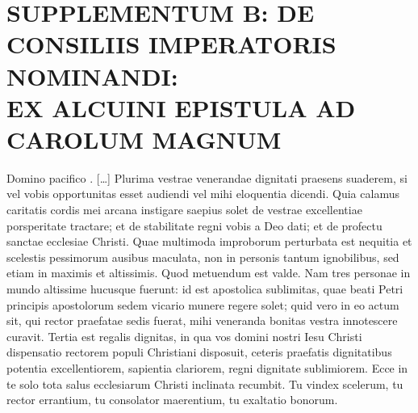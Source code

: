 \documentclass[12pt]{article}
\begin{document}
{		\section{SUPPLEMENTUM B: DE CONSILIIS IMPERATORIS NOMINANDI:\\ EX ALCUINI EPISTULA AD CAROLUM MAGNUM}
		\beginnumbering
		\pstart
		\noindent Domino pacifico . [\dots]
		\pend
		\pstart
		Plurima vestrae venerandae dignitati praesens suaderem, si vel vobis opportunitas esset audiendi vel mihi eloquentia dicendi. Quia calamus caritatis cordis mei arcana instigare saepius solet de vestrae excellentiae porsperitate tractare; et de stabilitate regni vobis a Deo dati; et de profectu sanctae ecclesiae Christi. Quae multimoda improborum perturbata est nequitia et scelestis pessimorum ausibus maculata, non in personis tantum ignobilibus, sed etiam in maximis et altissimis. Quod metuendum est valde.
		\pend
		\pstart
		Nam tres personae in mundo altissime hucusque fuerunt: id est apostolica sublimitas, quae beati Petri principis apostolorum sedem vicario munere regere solet; quid vero in eo actum sit, qui rector praefatae sedis fuerat, mihi veneranda bonitas vestra innotescere curavit.  Tertia est regalis dignitas, in qua vos domini nostri Iesu Christi dispensatio rectorem populi Christiani disposuit, ceteris praefatis dignitatibus potentia excellentiorem, sapientia clariorem, regni dignitate sublimiorem. Ecce in te solo tota salus ecclesiarum Christi inclinata recumbit. Tu vindex scelerum, tu rector errantium, tu consolator maerentium, tu exaltatio bonorum.
}
\end{document}
